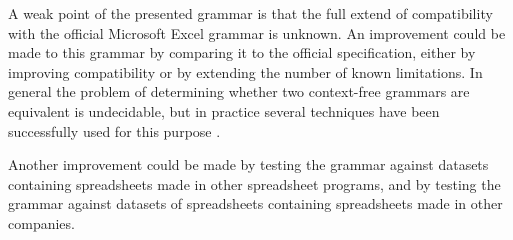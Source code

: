 \documentclass[conference]{IEEEtran}
\begin{document}
A weak point of the presented grammar is that the full extend of compatibility with the official Microsoft Excel grammar is unknown.
An improvement could be made to this grammar by comparing it to the official specification, either by improving compatibility or by extending the number of known limitations.
In general the problem of determining whether two context-free grammars are equivalent is undecidable, but in practice several techniques have been successfully used for this purpose \cite{lammel2009introduction,fischer2012comparison}.

Another improvement could be made by testing the grammar against datasets containing spreadsheets made in other spreadsheet programs, and by testing the grammar against datasets of spreadsheets containing spreadsheets made in other companies.




\end{document}
